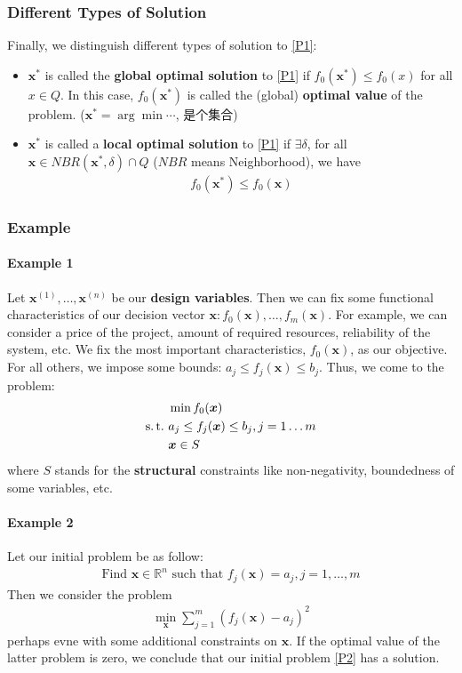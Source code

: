 \subsubsection{Different Types of Solution}
Finally, we distinguish different types of solution to \ref{P1}:
\begin{itemize}
    \item $\bm x^*$ is called the \textbf{global optimal solution} to \ref{P1} if $f_0(\bm x^*)\le f_0(x)$ for all $x\in Q$. In this case, $f_0(\bm x^*)$ is called the (global) \textbf{optimal value} of the problem. ($\bm x^*=\arg \min \cdots$, 是个集合)
    \item $\bm x^*$ is called a  \textbf{local optimal solution} to \ref{P1} if $\exists\delta$, for all $\bm x\in NBR(\bm x^*, \delta)\cap Q$ ($NBR$ means Neighborhood), we have 
    \begin{align*}
        f_0(\bm x^*)\le f_0(\bm x)
    \end{align*}
\end{itemize}

\subsubsection{Example}
\paragraph{Example 1} Let $\bm x^{(1)},\dots,\bm x^{(n)}$ be our \textbf{design variables}. Then we can fix some functional characteristics of our decision vector $\bm x:f_0(\bm x),\dots,f_m(\bm x)$. For example, we can consider a price of the project, amount of required resources, reliability of the system, etc. We fix the most important characteristics, $f_0(\bm x)$, as our objective. For all others, we impose some bounds: $a_j\le f_j(\bm x)\le b_j$. Thus, we come to the problem:
\begin{align*}
    &\min f_0(\bm x)\\
    \st &a_j\le f_j(\bm x) \le b_j, j=1\dots m\\
    &\bm{x} \in S
\end{align*}
where $S$ stands for the \textbf{structural} constraints like non-negativity, boundedness of some variables, etc. 

\paragraph{Example 2} Let our initial problem be as follow:
\begin{align}
    \label{P2} \text{Find } \bm x \in \mathbb{R}^n \text{ such that }f_j(\bm x)=a_j, j=1,\dots,m
\end{align}
Then we consider the problem
\begin{align*}
    \min_{\bm x}\sum_{j=1}^m(f_j(\bm x)-a_j)^2
\end{align*}
perhaps evne with some additional constraints on $\bm x$.  If the optimal value of the latter problem is zero, we conclude that our initial problem \ref{P2} has a solution.

